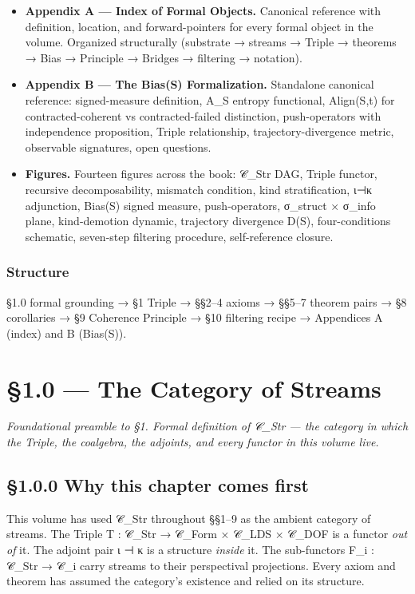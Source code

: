 \documentclass[11pt, openany]{book}
\newcommand{\sectionbreak}{\clearpage}
\begin{document}
\begin{itemize}
\item \textbf{Appendix A --- Index of Formal Objects.} Canonical reference with definition, location, and forward-pointers for every formal object in the volume. Organized structurally (substrate → streams → Triple → theorems → Bias → Principle → Bridges → filtering → notation).
\item \textbf{Appendix B --- The Bias(S) Formalization.} Standalone canonical reference: signed-measure definition, A\_\allowbreak{}S entropy functional, Align(S,t) for contracted-coherent vs contracted-failed distinction, push-operators with independence proposition, Triple relationship, trajectory-divergence metric, observable signatures, open questions.
\item \textbf{Figures.} Fourteen figures across the book: 𝒞\_\allowbreak{}Str DAG, Triple functor, recursive decomposability, mismatch condition, kind stratification, ι⊣κ adjunction, Bias(S) signed measure, push-operators, σ\_\allowbreak{}struct × σ\_\allowbreak{}info plane, kind-demotion dynamic, trajectory divergence D(S), four-conditions schematic, seven-step filtering procedure, self-reference closure.
\end{itemize}

\subsection{Structure}

§1.0 formal grounding → §1 Triple → §§2–4 axioms → §§5–7 theorem pairs → §8 corollaries → §9 Coherence Principle → §10 filtering recipe → Appendices A (index) and B (Bias(S)).

\chapter{§1.0 — The Category of Streams}


\textit{Foundational preamble to §1. Formal definition of 𝒞\_\allowbreak{}Str --- the category in which the Triple, the coalgebra, the adjoints, and every functor in this volume live.}

\sectionbreak

\section{§1.0.0 Why this chapter comes first}

This volume has used 𝒞\_\allowbreak{}Str throughout §§1–9 as the ambient category of streams. The Triple T : 𝒞\_\allowbreak{}Str → 𝒞\_\allowbreak{}Form × 𝒞\_\allowbreak{}LDS × 𝒞\_\allowbreak{}DOF is a functor \textit{out of} it. The adjoint pair ι ⊣ κ is a structure \textit{inside} it. The sub-functors F\_\allowbreak{}i : 𝒞\_\allowbreak{}Str → 𝒞\_\allowbreak{}i carry streams to their perspectival projections. Every axiom and theorem has assumed the category's existence and relied on its structure.
\end{document}
